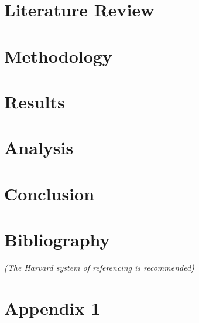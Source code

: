\documentclass{article}
\begin{document}
\section{Literature Review}

\newpage
\section{Methodology}

\newpage
\section{Results}

\newpage
\section{Analysis}

\newpage
\section{Conclusion}

\newpage 
\section*{Bibliography} 

\textit{(The Harvard system of referencing is recommended)} 


\newpage
\section*{Appendix 1} 
\end{document}
